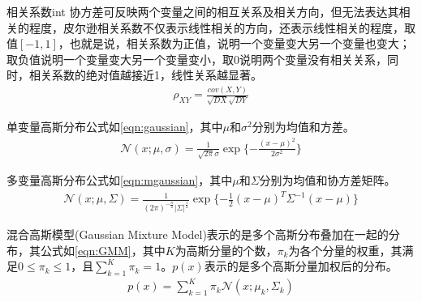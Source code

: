 \begin{definition}{相关系数}{int}
协方差可反映两个变量之间的相互关系及相关方向，但无法表达其相关的程度，皮尔逊相关系数不仅表示线性相关的方向，还表示线性相关的程度，取值$[-1,1]$，也就是说，相关系数为正值，说明一个变量变大另一个变量也变大；取负值说明一个变量变大另一个变量变小，取0说明两个变量没有相关关系，同时，相关系数的绝对值越接近1，线性关系越显著。
\begin{align}
\rho_{XY} = \frac{cov(X, Y)}{\sqrt{DX}\sqrt{DY}}
\end{align}
\end{definition}

\begin{definition}{协方差矩阵}{int}
 当$X\in{R^{n}$为高维数据时，协方差矩阵可以很好的反映数据的性质，在协方差矩阵中，对角线元素反映了数据在各个维度上的离散程度，协方差矩阵为对角阵，非对角线元素反映了数据各个维度的相关性，其形式如下:
\begin{align}
\Sigma = 
\begin{bmatrix}
cov(x_1, x_1) & cov(x_1, x_2) & \cdots & cov(x_1, x_n) \\
cov(x_2, x_1) & cov(x_2, x_2) & \cdots & cov(x_2, x_n) \\
\vdots        & \vdots        & \ddots    & \vdots \\
cov(x_n, x_1) & cov(x_n, x_2) & \cdots & cov(x_n, x_n) 
\end{bmatrix}
\end{align}
\end{definition}

单变量高斯分布公式如\ref{eqn:gaussian}，其中$\mu$和$\sigma^{2}$分别为均值和方差。
\begin{align}
\label{eqn:gaussian}
\mathcal{N}(x; \mu, \sigma) = \frac{1}{\sqrt{2\pi}\sigma}\exp{\{-\frac{(x-\mu)^{2}}{2\sigma^{2}}\}}
\end{align}

多变量高斯分布公式如\ref{eqn:mgaussian}，其中$\mu$和$\Sigma$分别为均值和协方差矩阵。
\begin{align}
\label{eqn:mgaussian}
\mathcal{N}(x; \mu, \Sigma) = \frac{1}{(2\pi)^{-\frac{n}{2}}|\Sigma|^{\frac{1}{2}}}\exp{\{-\frac{1}{2}(x-\mu)^{T}\Sigma^{-1}(x-\mu)\}}
\end{align}

混合高斯模型(Gaussian Mixture Model)表示的是多个高斯分布叠加在一起的分布，其公式如\ref{eqn:GMM}，其中$K$为高斯分量的个数，$\pi_{k}$为各个分量的权重，其满足$0 \leq \pi_{k} \leq 1$，且$\sum_{k=1}^{K}\pi_{k}=1$。$p(x)$表示的是多个高斯分量加权后的分布。
\begin{align}
\label{eqn:GMM}
p(x) = \sum_{k=1}^{K}\pi_{k}\mathcal{N}(x; \mu_{k}, \Sigma_{k})
\end{align}

